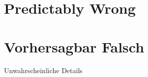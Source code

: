 \ifEnglish

\section{Predictably Wrong}





\else

\section{Vorhersagbar Falsch}

\begin{frame}[c]{Unwahrscheinliche Details}
    
\end{frame}





\fi
